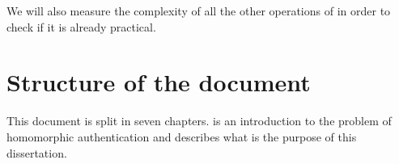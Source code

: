 We will also measure the complexity of all the other operations of
\textcite{catalano:fiore:2013} in order to check if it is already practical.

\begin{comment}
In this work we will mainly focus on homomorphic MAC schemes, and all of them
rely on the theory of arithmetic circuits.
%
In practical terms, it is important to stress that arithmetic circuits should
be seen as computing \emph{specific} polynomials in $\bbF[x]$ rather than
functions $\bbF^{|x|}$ to $\bbF$. Essentially, one is interested in the formal
computation of polynomials rather than the functions that these polynomials
define. This is because a function may be expressed by a polynomial in several
ways, while, in general, a polynomial defines a unique function.\footnote{A
  good example of this case is the zero function. $f = x^2 + x$ is clearly not
the zero function, unless it is in $\bbF_2$.}

The scheme from \textcite{gennaro:wichs:2012} relies heavily on lattice based
techniques, which are not practically efficient, and given that the scheme's
security is based on a weaker security model, we choose not to study its
implementation, but only its theoretical definitions. We will instead focus our
implementation efforts on the last two
schemes~\cite{catalano:fiore:2013,backes:fiore:reischuk:2013} that are
efficient in theory, but it is not known if they have any practical
application.  Our main objective is to determine how practicable they are.

However, it is still interesting to see how both homomorphic signatures and MAC
schemes work. We will study these schemes to see what functionalities they
offer and what limitations they might have.

In the end, an overall comparison between the implemented schemes will be
presented in order to determine which one is practically more efficient.
\end{comment}

\section{Structure of the document}
This document is split in seven chapters.  is an
introduction to the problem of homomorphic authentication and describes what is
the purpose of this dissertation.

